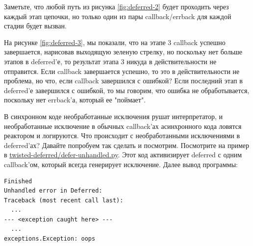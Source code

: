 Заметьте, что любой путь из рисунка \ref{fig:deferred-2} будет 
проходить через каждый этап цепочки, но только один из пары 
callback/errback для каждой стадии будет вызван.
 

На рисунке \ref{fig:deferred-3}, мы показали, что на этапе 3 
callback успешно завершается, нарисовав выходящую зеленую стрелку, 
но поскольку нет больше этапов в deferred'е, то результат этапа 3 
никуда в действительности не отправится. Если callback завершается 
успешно, то это в действительности не проблема, но что, если 
callback завершился с ошибкой? Если последний этап в deferred'е 
завершился с ошибкой, то мы говорим, что ошибка не обработывается, 
поскольку нет errback'а, который ее "поймает".


В синхронном коде необработанные исключения рушат 
интерпретатор, и необработанные исключение в обычных callback'ах 
асинхронного кода ловятся реактором и логируются. Что 
происходит с необработанными исключениями в deferred'ах? 
Давайте попробуем так сделать и посмотрим. Посмотрите на 
пример в 
\href{http://github.com/jdavisp3/twisted-intro/blob/master/twisted-deferred/defer-unhandled.py#L1}{twisted-deferred/defer-unhandled.py}. 
Этот код активизирует deferred с одним callback'ом, который 
всегда генерирует исключение. Далее вывод программы:


\begin{scriptsize}\begin{verbatim}
Finished
Unhandled error in Deferred:
Traceback (most recent call last):
  ...
--- <exception caught here> ---
  ...
exceptions.Exception: oops
\end{verbatim}\end{scriptsize}



